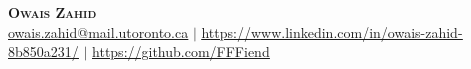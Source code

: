 \begin{center}
	\textbf{\Huge \scshape Owais Zahid} \\ \vspace{5pt}
    \href{owais.zahid@mail.utoronto.ca}{\underline{owais.zahid@mail.utoronto.ca}} $|$
	\href{https://www.linkedin.com/in/owais-zahid-8b850a231/}{\underline{https://www.linkedin.com/in/owais-zahid-8b850a231/}} $|$
	\href{https://github.com/FFFiend}{\underline{https://github.com/FFFiend}}
\end{center}
